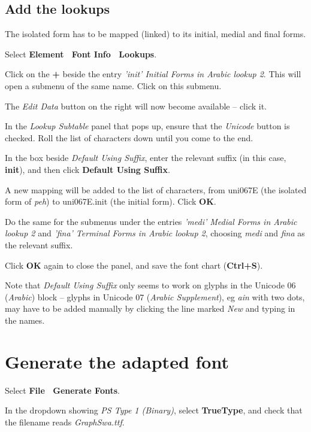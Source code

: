 \subsection{Add the lookups}

The isolated form has to be mapped (linked) to its initial, medial and final forms.

Select \textbf{Element \textrightarrow\ Font Info \textrightarrow\ Lookups}.

Click on the \textbf{+} beside the entry \textit{'init' Initial Forms in Arabic lookup 2}.  This will open a submenu of the same name.  Click on this submenu.

The \textit{Edit Data} button on the right will now become available -- click it.

In the \textit{Lookup Subtable} panel that pops up, ensure that the \textit{Unicode} button is checked.  Roll the list of characters down until you come to the end.

In the box beside \textit{Default Using Suffix}, enter the relevant suffix (in this case, \textbf{init}), and then click \textbf{Default Using Suffix}.

A new mapping will be added to the list of characters, from uni067E (the isolated form of \textit{peh}) to uni067E.init (the initial form).
Click \textbf{OK}.

Do the same for the submenus under the entries \textit{'medi' Medial Forms in Arabic lookup 2} and \textit{'fina' Terminal Forms in Arabic lookup 2}, choosing \textit{medi} and \textit{fina} as the relevant suffix.

Click \textbf{OK} again to close the panel, and save the font chart (\textbf{Ctrl+S}).

Note that \textit{Default Using Suffix} only seems to work on glyphs in the Unicode 06 (\textit{Arabic}) block -- glyphs in Unicode 07 (\textit{Arabic Supplement}), eg \textit{ain} with two dots, may have to be added manually by clicking the line marked \textit{New} and typing in the names.

\section{Generate the adapted font}

Select \textbf{File \textrightarrow\ Generate Fonts}.

In the dropdown showing \textit{PS Type 1 (Binary)}, select \textbf{TrueType}, and check that the filename reads \textit{GraphSwa.ttf}.

